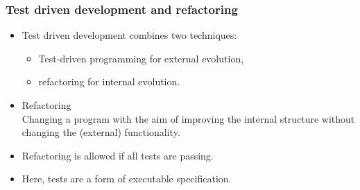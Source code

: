 



\begin{frame}
\frametitle{Test driven development and refactoring}
\begin{itemize}
  \item Test driven development combines two techniques: 
    \begin{itemize}
      \item Test-driven programming for external evolution,
      \item refactoring for internal evolution.
    \end{itemize}
  \item Refactoring\\
        Changing a program with the aim of improving the internal structure without changing the (external) functionality.
  \item Refactoring is allowed if all tests are passing.
  \item Here, tests are a form of executable specification.
\end{itemize}
\end{frame}

